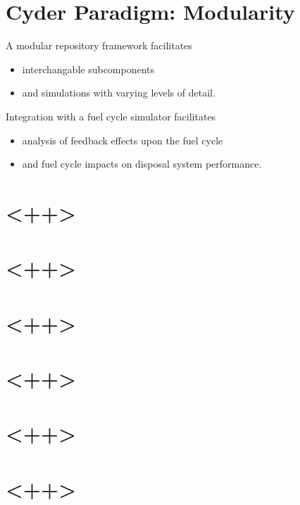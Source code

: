 \documentclass[letterpaper]{article}
\begin{document}
\section*{Cyder Paradigm: Modularity}
A modular repository framework facilitates
\begin{itemize}
\item interchangable subcomponents
\item and simulations with varying levels of detail.
\end{itemize}
Integration with a fuel cycle simulator facilitates
\begin{itemize}
\item analysis of feedback effects upon the fuel cycle
\item and fuel cycle impacts on disposal system performance.
\end{itemize}

\section*{<++>}
\section*{<++>}
\section*{<++>}
\section*{<++>}
\section*{<++>}
\section*{<++>}


\pagebreak


\end{document}
